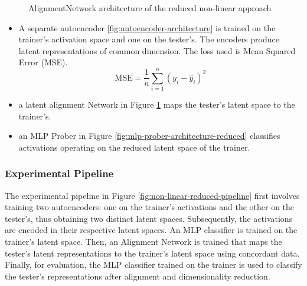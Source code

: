\begin{figure}[t]
{%
}
    \caption{AlignmentNetwork architecture of the reduced non-linear approach}
    \label{fig:alignmentnetwork-architecture-reduced}
\end{figure}

\begin{itemize}
\item A separate autoencoder \ref{fig:autoencoder-architecture} is trained on the trainer's activation space and one on the tester's. The encoders produce latent representations of common dimension. The loss used is Mean Squared Error (MSE).
\begin{equation}
\label{eq:mse}
\text{MSE} = \frac{1}{n} \sum_{i=1}^{n} (y_i - \hat{y}_i)^2
\end{equation}

\item a latent alignment Network in Figure \ref{fig:alignmentnetwork-architecture-reduced} maps the tester's latent space to the trainer's.
\item an MLP Prober in Figure \ref{fig:mlp-prober-architecture-reduced} classifies activations operating on the reduced latent space of the trainer.
\end{itemize}

\subsubsection{Experimental Pipeline}
The experimental pipeline in Figure \ref{fig:non-linear-reduced-pipeline} first involves training two autoencoders: one on the trainer's activations and the other on the tester's, thus obtaining two distinct latent spaces. Subsequently, the activations are encoded in their respective latent spaces. An MLP classifier is trained on the trainer's latent space. Then, an Alignment Network is trained that maps the tester's latent representations to the trainer's latent space using concordant data. Finally, for evaluation, the MLP classifier trained on the trainer is used to classify the tester's representations after alignment and dimensionality reduction.


